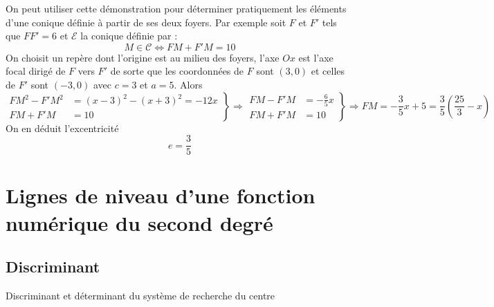 \begin{rem}
On peut utiliser cette démonstration pour déterminer pratiquement les éléments d'une conique définie à partir de ses deux foyers. Par exemple soit $F$ et $F'$ tels que $FF'=6$ et  $\mathcal{E}$ la conique définie par :
\begin{displaymath}
 M\in \mathcal{C} \Leftrightarrow FM + F'M = 10
\end{displaymath}
 On choisit un repère dont l'origine est au milieu des foyers, l'axe $Ox$ est l'axe focal dirigé de $F$ vers $F'$ de sorte que les coordonnées de $F$ sont $(3,0)$ et celles de $F'$ sont $(-3,0)$ avec $c=3$ et $a=5$. Alors
\begin{displaymath}
\left. 
\begin{aligned}
FM^2 - F'M^2 &= (x-3)^2 - (x+3)^2 = -12x \\
FM + F'M &= 10
\end{aligned}
\right\rbrace \Rightarrow
\left. 
\begin{aligned}
FM - F'M &= -\frac{6}{5}x \\
FM + F'M &= 10
\end{aligned}
\right\rbrace \Rightarrow
FM = -\frac{3}{5}x+5 = \frac{3}{5}\left( \frac{25}{3}-x\right)  
\end{displaymath}
On en déduit l'excentricité 
\begin{displaymath}
 e=\frac{3}{5}
\end{displaymath}
\end{rem}



\section{Lignes de niveau d'une fonction numérique du second degré}
\subsection{Discriminant}
Discriminant et déterminant du système de recherche du centre
